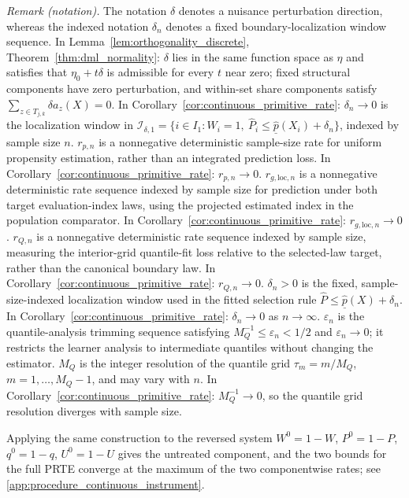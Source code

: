 \noindent\textit{Remark (notation).} The notation $\delta$ denotes a nuisance perturbation direction, whereas the indexed notation $\delta_n$ denotes a fixed boundary-localization window sequence. In Lemma~\ref{lem:orthogonality_discrete}, Theorem~\ref{thm:dml_normality}: $\delta$ lies in the same function space as $\eta$ and satisfies that $\eta_0+t\delta$ is admissible for every $t$ near zero; fixed structural components have zero perturbation, and within-set share components satisfy $\sum_{z\in T_{j,k}}\delta a_z(X)=0$. In Corollary~\ref{cor:continuous_primitive_rate}: $\delta_n\to0$ is the localization window in $\mathcal I_{\delta,1}=\{i\in I_1:W_i=1,\ \hat P_i\leqslant\hat{\underline p}(X_i)+\delta_n\}$, indexed by sample size $n$. $r_{p,n}$ is a nonnegative deterministic sample-size rate for uniform propensity estimation, rather than an integrated prediction loss. In Corollary~\ref{cor:continuous_primitive_rate}: $r_{p,n}\to0$. $r_{g,\mathrm{loc},n}$ is a nonnegative deterministic rate sequence indexed by sample size for prediction under both target evaluation-index laws, using the projected estimated index in the population comparator. In Corollary~\ref{cor:continuous_primitive_rate}: $r_{g,\mathrm{loc},n}\to0$. $r_{Q,n}$ is a nonnegative deterministic rate sequence indexed by sample size, measuring the interior-grid quantile-fit loss relative to the selected-law target, rather than the canonical boundary law. In Corollary~\ref{cor:continuous_primitive_rate}: $r_{Q,n}\to0$. $\delta_n>0$ is the fixed, sample-size-indexed localization window used in the fitted selection rule $\hat P\le\hat{\underline p}(X)+\delta_n$. In Corollary~\ref{cor:continuous_primitive_rate}: $\delta_n\to0$ as $n\to\infty$. $\varepsilon_n$ is the quantile-analysis trimming sequence satisfying $M_Q^{-1}\le\varepsilon_n<1/2$ and $\varepsilon_n\to0$; it restricts the learner analysis to intermediate quantiles without changing the estimator. $M_Q$ is the integer resolution of the quantile grid $\tau_m=m/M_Q$, $m=1,\ldots,M_Q-1$, and may vary with $n$. In Corollary~\ref{cor:continuous_primitive_rate}: $M_Q^{-1}\to0$, so the quantile grid resolution diverges with sample size.


Applying the same construction to the reversed system $W^0=1-W$, $P^0=1-P$, $q^0=1-q$, $U^0=1-U$ gives the untreated component, and the two bounds for the full PRTE converge at the maximum of the two componentwise rates; see \cref{app:procedure_continuous_instrument}.
